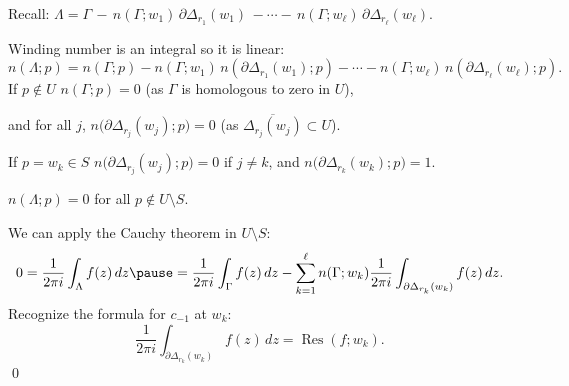 \documentclass[10pt,aspectratio=169]{beamer}
\begin{document}
\begin{frame}

{\small \hfill Recall: 
$\Lambda = \Gamma \,
- \, n(\Gamma;w_1) \, \partial \Delta_{r_1} (w_1)
\, -
\cdots
- \, n(\Gamma;w_\ell) \, \partial \Delta_{r_\ell} (w_\ell)$.}

\medskip
\pause

Winding number is an integral so it is linear:
\[
n(\Lambda;p) = n(\Gamma;p)
- n(\Gamma;w_1) \, n(\partial \Delta_{r_1} (w_1) ; p)
-
\cdots
- n(\Gamma;w_\ell) \, n(\partial \Delta_{r_\ell} (w_\ell) ; p) .
\]
\pause
If $p \notin U$ \wthus $n(\Gamma;p) = 0$ \quad (as $\Gamma$ is homologous to zero in
$U$),

\pause
and for all $j$, \quad $n\bigl( \partial \Delta_{r_j}(w_j) ; p\bigr) = 0$
\quad (as $\overline{\Delta_{r_j}(w_j)} \subset U$).

\medskip
\pause

If $p = w_k \in S$ \wthus $n\bigl( \partial \Delta_{r_j}(w_j) ; p\bigr) = 0$ if $j \not= k$,
and
$n\bigl( \partial \Delta_{r_k}(w_k) ; p\bigr) = 1$.

\pause
\medskip

\thus \quad $n(\Lambda;p) = 0$ for all $p \notin U \setminus S$.

\medskip
\pause

We can apply the Cauchy theorem in $U \setminus S$:
\begin{equation*}
0 = 
\frac{1}{2 \pi i}
\int_\Lambda f(z) \, dz
\pause
=
\frac{1}{2 \pi i}
\int_\Gamma f(z) \, dz
-
\sum_{k=1}^\ell
n(\Gamma;w_k)
\frac{1}{2 \pi i}
\int_{\partial \Delta_{r_k}(w_k)} f(z) \, dz .
\end{equation*}
\pause
Recognize the formula for $c_{-1}$ at $w_k$:
\begin{equation*}
\frac{1}{2 \pi i}
\int_{\partial \Delta_{r_k}(w_k)} f(z) \, dz
= \operatorname{Res}(f;w_k) .
\end{equation*}
\qed
\end{frame}
\end{document}
